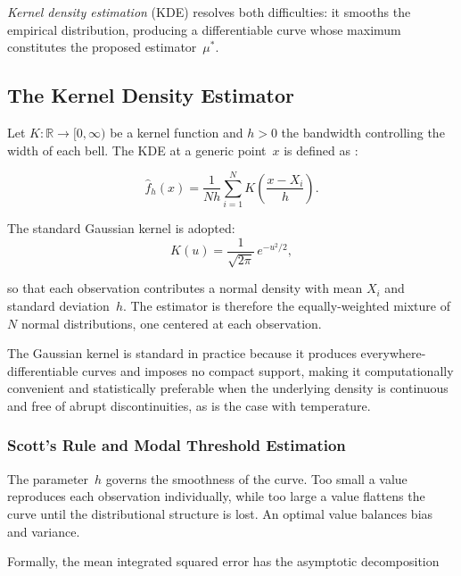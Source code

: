 \documentclass[APA,STIX1COL]{WileyNJD-v2}
\begin{document}
\emph{Kernel density estimation} (KDE) resolves both
difficulties: it smooths the empirical distribution, producing a
differentiable curve whose maximum constitutes the proposed
estimator~$\mu^*$.

\subsection{The Kernel Density Estimator}\label{subsec:kde}

Let $K:\mathbb{R}\to[0,\infty)$ be a kernel function and $h>0$
the bandwidth controlling the width of each bell. The KDE at a
generic point~$x$ is defined as \citep{rosenblatt1956,parzen1962}:

\begin{equation}\label{eq:kde}
\hat{f}_h(x)
  = \frac{1}{Nh}\sum_{i=1}^{N}
    K\!\left(\frac{x - X_i}{h}\right).
\end{equation}

\medskip

The standard Gaussian kernel is adopted:
\begin{equation}\label{eq:kde_gauss}
K(u) = \frac{1}{\sqrt{2\pi}}\,e^{-u^2/2},
\end{equation}

\medskip

so that each observation contributes a normal density with mean
$X_i$ and standard deviation~$h$. The estimator is therefore the
equally-weighted mixture of $N$ normal distributions, one
centered at each observation.

The Gaussian kernel is standard in practice because it produces
everywhere-differentiable curves and imposes no compact support,
making it computationally convenient and statistically preferable
when the underlying density is continuous and free of abrupt
discontinuities, as is the case with temperature.

\subsubsection{Scott's Rule and Modal Threshold Estimation}

The parameter~$h$ governs the smoothness of the curve. Too
small a value reproduces each observation individually, while
too large a value flattens the curve until the distributional
structure is lost. An optimal value balances bias and variance.

Formally, the mean integrated squared error has the asymptotic
decomposition
\end{document}
